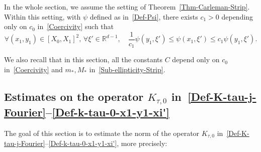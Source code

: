 \documentclass[AHL,Unicode,longabstracts]{cedram}
\newcommand*\R{\mathbb{R}}
\renewcommand{\leq}{\leqslant}
\let\oldforall\forall
\renewcommand*{\forall}{\mathrel{\oldforall}}
\begin{document}
In the whole section, we assume the setting of Theorem~\ref{Thm-Carleman-Strip}. Within this setting, with $\psi$ defined as in~\eqref{Def-Psi}, there exists $c_1 >0$ depending only on $c_0$ in~\eqref{Coercivity} such that
\begin{equation}\label{Equivalences-Psi-x-xi}
\forall (x_1,y_1) \in [X_0,X_1]^2,\, \forall \xi' \in \R^{d-1},
\quad
\frac{1}{c_1} \psi(y_1,\xi') \leq \psi(x_1, \xi') \leq c_1 \psi(y_1,\xi').
\end{equation}

We also recall that in this section, all the constants $C$ depend only on $c_0$ in~\eqref{Coercivity} and $m_*, M_*$ in~\eqref{Sub-ellipticity-Strip}.



\subsection{Estimates on the operator \texorpdfstring{$K_{\tau, 0}$}{K tau, 0} in~\eqref{Def-K-tau-j-Fourier}--\eqref{Def-k-tau-0-x1-y1-xi'}}

The goal of this section is to estimate the norm of the operator $K_{\tau, 0}$ in~\eqref{Def-K-tau-j-Fourier}--\eqref{Def-k-tau-0-x1-y1-xi'}, more precisely:
\end{document}

